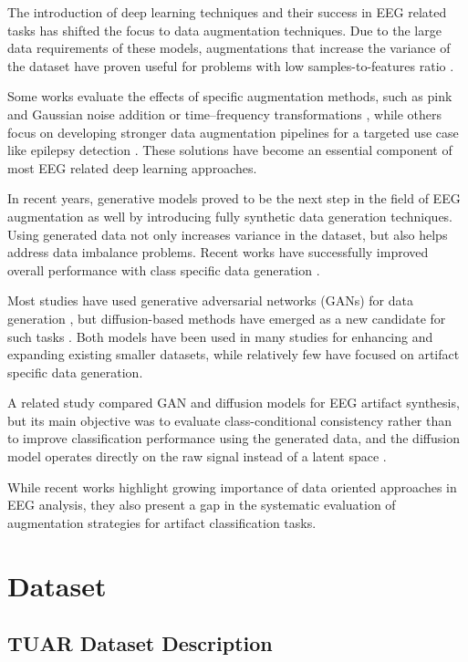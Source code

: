 The introduction of deep learning techniques and their success in EEG related tasks has shifted the focus to data augmentation techniques. Due to the large data requirements of these models, augmentations that increase the variance of the dataset have proven useful for problems with low samples-to-features ratio \cite{LASHGARI2020108885}.

Some works evaluate the effects of specific augmentation methods, such as pink and Gaussian noise addition \cite{pink} or time–frequency transformations \cite{WANG2025113074}, while others focus on developing stronger data augmentation pipelines for a targeted use case like epilepsy detection \cite{epi}. These solutions have become an essential component of most EEG related deep learning approaches. 

In recent years, generative models proved to be the next step in the field of EEG augmentation as well by introducing fully synthetic data generation techniques. Using generated data not only increases variance in the dataset, but also helps address data imbalance problems. Recent works have successfully improved overall performance with class specific data generation \cite{Fan_2020}.

Most studies have used generative adversarial networks (GANs) for data generation \cite{gan2}, but diffusion-based methods have emerged as a new candidate for such tasks \cite{puah2025}. Both models have been used in many studies for enhancing and expanding existing smaller datasets, while relatively few have focused on artifact specific data generation.

A related study compared GAN and diffusion models for EEG artifact synthesis, but its main objective was to evaluate class-conditional consistency rather than to improve classification performance using the generated data, and the diffusion model operates directly on the raw signal instead of a latent space \cite{arasu2025}.

While recent works highlight growing importance of data oriented approaches in EEG analysis, they also present a gap in the systematic evaluation of augmentation strategies for artifact classification tasks.

\newpage

\section{Dataset}

\subsection{TUAR Dataset Description}

